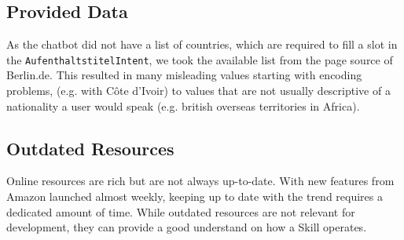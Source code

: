 \subsection*{Provided Data}
As the chatbot did not have a list of countries, which are required to fill a slot in the \texttt{AufenthaltstitelIntent}, we took the available list from the page source of Berlin.de. This resulted in many misleading values starting with encoding problems, %
(e.g. with Côte d'Ivoir) to values that are not usually descriptive of a nationality a user would speak (e.g. british overseas territories in Africa).




%
%
%

\subsection*{Outdated Resources}
Online resources are rich but are not always up-to-date. %
With new features from Amazon launched almost weekly, keeping up to date with the trend requires a dedicated amount of time.
While outdated resources are not relevant for development, they can provide a good understand on how a Skill operates. %
%
%
%

%
%
%
%



